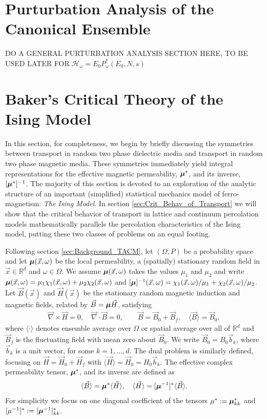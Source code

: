 \documentclass[english,12pt]{ttuthes}
\newcommand\bmu{\mbox{\boldmath${\mu}$}}
\begin{document}
\section{Purturbation Analysis of the Canonical Ensemble}
\label{sec:Purturb_Can_Ens}
%
DO A GENERAL PURTURBATION ANALYSIS SECTION HERE, TO BE USED LATER FOR
$\mathcal{H}_\omega=E_0P^*_\omega(E_0,N,s)$
%
\section{Baker's Critical Theory of the Ising Model}
\label{sec:Magnetic_Systems}
%
In this section, for completeness, we begin by briefly discussing the
symmetries between transport in random two phase dielectric media and
transport in random two phase magnetic media. These symmetries
immediately yield integral representations for the effective
magnetic permeability, $\bmu^*$, and its inverse, $[\bmu^*]^{-1}$. The
majority of this section is devoted to an exploration of the analytic
structure of an important (simplified) statistical mechanics model of
ferro-magnetism: \emph{The Ising Model}. In section
\ref{sec:Crit_Behav_of_Transport} we will show that the critical 
behavior of transport in lattice and continuum percolation models 
mathematically parallels the percolation characteristics of the Ising
model, putting these two classes of problems on an equal footing. 

Following section \ref{sec:Background_TACM}, let $(\Omega,P)$ be a
probability space and let $\bmu(\vec{x},\omega)$ be the local permeability,
a (spatially) stationary random field in $\vec{x}\in\mathbb{R}^d$ and
$\omega\in\Omega$. We assume $\bmu(\vec{x},\omega)$ takes the values $\mu_1$ and $\mu_2$
and write $\bmu(\vec{x},\omega)=\mu_1\chi_1(\vec{x},\omega)+\mu_2\chi_2(\vec{x},\omega)$ and
$[\bmu]^{-1}(\vec{x},\omega)=\chi_1(\vec{x},\omega)/\mu_1+\chi_2(\vec{x},\omega)/\mu_2$. Let
$\vec{B}(\vec{x})$ and $\vec{H}(\vec{x})$ be the stationary random
magnetic induction and magnetic fields, related by
$\vec{B}=\bmu\vec{H}$, satisfying \cite{Golden:CMP-473}   
%
\begin{align}\label{eq:Maxwells_Equations_HB}  
	\vec{\nabla}\times\vec{H}=0, \quad
	\vec{\nabla}\cdot\vec{B}=0,\quad \quad	
	\vec{B}=\vec{B}_0+\vec{B}_f, \quad
	\langle\vec{B}\rangle=\vec{B}_0,
\end{align}
%
where $\langle\cdot\rangle$ denotes ensemble average over $\Omega$ or spatial average
over all of ${\mathbb{R}}^d$ and $\vec{B}_f$ is the fluctuating field
with mean zero about $\vec{B}_0$. We write $\vec{B}_0=B_0\vec{b}_k$,
where $\vec{b}_k$ is a unit vector, for some $k = 1, \ldots, d$. The dual
problem is similarly defined, focusing on
$\vec{H}=\vec{H}_0+\vec{H}_f$ with
$\langle\vec{H}\rangle=\vec{H}_0=H_0\vec{h}_k$. The effective complex 
permeability tensor, $\bmu^*$, and its inverse are defined as  
%
\begin{align}\label{eq:eff_mu_def}
    \langle\vec{B}\rangle=\bmu^*\langle\vec{H}\rangle, \quad 
    \langle\vec{H}\rangle=[\bmu^{-1}]^*\langle\vec{B}\rangle.
\end{align}
%
For simplicity we focus on one diagonal coefficient of the tensors
$\mu^*:=\bmu^*_{kk}$ and $[\mu^{-1}]^*:=[\bmu^{-1}]^*_{kk}$.
\end{document}
